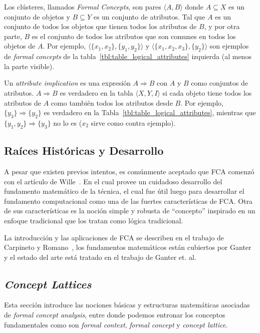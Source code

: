 \documentclass[12pt,oneside,letterpaper]{book}
\newcommand{\eng}[1]{\textit{#1}\xspace}			%
\newcommand{\abr}[1]{\textsc{#1}\xspace}           %
\theoremstyle{definition}
\begin{document}
Los clústeres, llamados \eng{Formal Concepts}, son pares $\langle A,B \rangle$ donde $A \subseteq X$ es un conjunto de objetos y $B \subseteq Y$ es un conjunto de atributos. Tal que $A$ es un conjunto de todos los objetos que tienen todos los atributos de $B$, y por otra parte, $B$ es el conjunto de todos los atributos que son comunes en todos los objetos de $A$. Por ejemplo, $\langle \{x_1, x_2\}, \{y_1, y_2\} \rangle$ y $\langle \{x_1, x_2, x_3\}, \{y_2\} \rangle$ son ejemplos de \eng{formal concepts} de la tabla~\ref{tbl:table_logical_attributes} izquierda (al menos la parte visible).

Un \eng{attribute implication} es una expresión $A \Rightarrow B$ con $A$ y $B$  como conjuntos de atributos. $A \Rightarrow B$ es verdadero en la tabla $\langle X,Y,I \rangle$ si cada objeto tiene todos los atributos de $A$ como también todos los atributos desde $B$. Por ejemplo, $\{y_3\} \Rightarrow \{y_2\}$ es verdadero en la Tabla~\ref{tbl:table_logical_attributes}, mientras que $\{y_1,y_2\} \Rightarrow \{y_3\}$ no lo es ($x_2$ sirve como contra ejemplo).

\subsection{Raíces Históricas y Desarrollo} %
\label{sub:ra_ces_historicas_y_desarrollo}
A pesar que existen previos intentos, es comúnmente aceptado que \abr{FCA} comenzó con el artículo de Wille~\cite{wille1982}. En el cual provee un cuidadoso desarrollo del fundamento matemático de la técnica, el cual fue útil luego para desarrollar el fundamento computacional como una de las fuertes características de \abr{FCA}. Otra de sus características es la noción simple y robusta de ``concepto'' inspirado en un enfoque tradicional que los tratan como lógica tradicional. 

La introducción y las aplicaciones de \abr{FCA} se describen en el trabajo de Carpineto y Romano~\cite{carpineto2004}, los fundamentos matemáticos están cubiertos por Ganter~\cite{Ganter1997} y el estado del arte está tratado en el trabajo de Ganter et. al.~\cite{Ganter2005}

\subsection{\eng{Concept Lattices}}
\label{sub:concept_lattices}
Esta sección introduce las nociones básicas y estructuras matemáticas asociadas de \eng{formal concept analysis}, entre donde podemos entronar los conceptos fundamentales como son \eng{formal context}, \eng{formal concept} y \eng{concept lattice}.
\end{document}
